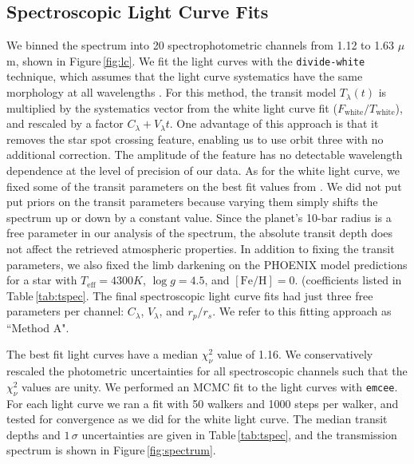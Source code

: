 \documentclass[twocolumn, trackchanges]{aastex61}
\begin{document}
\subsection{Spectroscopic Light Curve Fits}
We binned the spectrum into 20 spectrophotometric channels from 1.12 to 1.63 $\mu$m, shown in Figure\,\ref{fig:lc}. We fit the light curves with the \texttt{divide-white} technique, which assumes that the light curve systematics have the same morphology at all wavelengths \citep{stevenson14c, kreidberg14a}. For this method, the transit model $T_\lambda(t)$ is multiplied by the systematics vector from the white light curve fit ($F_\mathrm{white}/T_\mathrm{white}$), and rescaled by a factor $C_\lambda + V_\lambda t$.  One advantage of this approach is that it removes the star spot crossing feature, enabling us to use orbit three with no additional correction. The amplitude of the feature has no detectable wavelength dependence at the level of precision of our data.  As for the white light curve, we fixed some of the transit parameters on the best fit values from \cite{dai17}. We did not put put priors on the transit parameters because varying them simply shifts the spectrum up or down by a constant value. Since the planet's 10-bar radius is a free parameter in our analysis of the spectrum, the absolute transit depth does not affect the retrieved atmospheric properties. In addition to fixing the transit parameters, we also fixed the limb darkening on the PHOENIX model predictions for a star with $T_\mathrm{eff} = 4300 K$, $\log g = 4.5$, and $[\mathrm{Fe/H}] = 0.$ (coefficients listed in Table\,\ref{tab:tspec}.  The final spectroscopic light curve fits had just three free parameters per channel: $C_\lambda$, $V_\lambda$, and $r_p/r_s$.  We refer to this fitting approach as ``Method A".

The best fit light curves have a median $\chi^2_\nu$ value of 1.16.  We
conservatively rescaled the photometric uncertainties for all spectroscopic
channels such that the $\chi^2_\nu$ values are unity. We performed an MCMC fit
to the light curves with \texttt{emcee}.  For each light curve we ran a fit with
50 walkers and 1000 steps per walker, and tested for convergence as we did for
the white light curve. The median transit depths and $1\,\sigma$ uncertainties
are given in Table\,\ref{tab:tspec}, and the transmission spectrum is shown in
Figure\,\ref{fig:spectrum}. 
\end{document}
